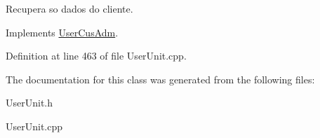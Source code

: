 Recupera so dados do cliente. 



Implements \hyperlink{classUserCusAdm_a8a67bf25c965e931be912f33449e0f8a}{User\-Cus\-Adm}.



Definition at line 463 of file User\-Unit.\-cpp.



The documentation for this class was generated from the following files\-:\begin{DoxyCompactItemize}
\item 
User\-Unit.\-h\item 
User\-Unit.\-cpp\end{DoxyCompactItemize}
